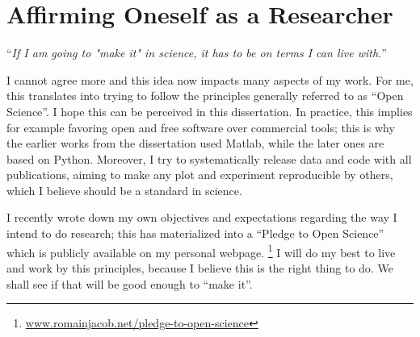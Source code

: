 \newpage
\section{Affirming Oneself as a Researcher}

\squarepar{%
  Pursuing a doctorate degree is not only about writing a dissertation: it is a fundamental training step towards affirming oneself as a researcher.
  The shaping of my own researcher identify has been strongly influenced by this statement%
  \footnote{Erin McKiernan. \href{http://dx.doi.org/10.6084/m9.figshare.954994}{10.6084/m9.figshare.954994}}%
}
\begin{center}
  ``\emph{If I am going to "make it" in science, it has to be on terms I can live with.}''
\end{center}
I cannot agree more and this idea now impacts many aspects of my work.\linebreak
For me, this translates into trying to follow the principles generally referred to as ``Open Science''. I hope this can be perceived in this dissertation.
In practice, this implies for example favoring open and free software over commercial tools; this is why the earlier works from the dissertation used Matlab, while the later ones are based on Python.
Moreover, I try to systematically release data and code with all publications, aiming to make any plot and experiment reproducible by others, which I believe should be a standard in science.

I recently wrote down my own objectives and expectations regarding the way I intend to do research; this has materialized into a ``Pledge to Open Science'' which is publicly available on my personal webpage.%
%
\footnote{\href{http://www.romainjacob.net/pledge-to-open-science/}{www.romainjacob.net/pledge-to-open-science}}
%
I will do my best to live and work by this principles, because I believe this is the right thing to do. \linebreak
We shall see if that will be good enough to ``make it''.
